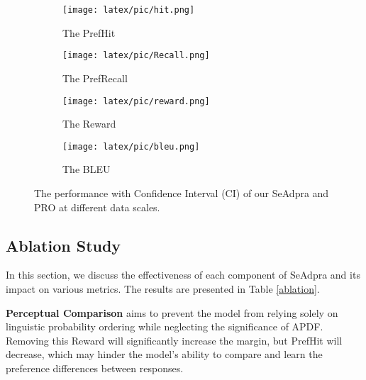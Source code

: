 \begin{figure}
  \centering
  \begin{subfigure}{0.49\linewidth}
    \texttt{[image: latex/pic/hit.png]}
    \caption{The PrefHit}
    \label{scale:hit}
  \end{subfigure}
  \begin{subfigure}{0.49\linewidth}
    \texttt{[image: latex/pic/Recall.png]}
    \caption{The PrefRecall}
    \label{scale:recall}
  \end{subfigure}
  \medskip
  \begin{subfigure}{0.48\linewidth}
    \texttt{[image: latex/pic/reward.png]}
    \caption{The Reward}
    \label{scale:reward}
  \end{subfigure}
  \begin{subfigure}{0.48\linewidth}
    \texttt{[image: latex/pic/bleu.png]}
    \caption{The BLEU}
    \label{scale:bleu}
  \end{subfigure}
  \caption{The performance with Confidence Interval (CI) of our SeAdpra and PRO at different data scales.}
  \label{fig:scale}
\end{figure}

\subsection{Ablation Study}

In this section, we discuss the effectiveness of each component of SeAdpra and its impact on various metrics. The results are presented in Table \ref{ablation}.

\textbf{Perceptual Comparison} aims to prevent the model from relying solely on linguistic probability ordering while neglecting the significance of APDF. Removing this Reward will significantly increase the margin, but PrefHit will decrease, which may hinder the model's ability to compare and learn the preference differences between responses.

